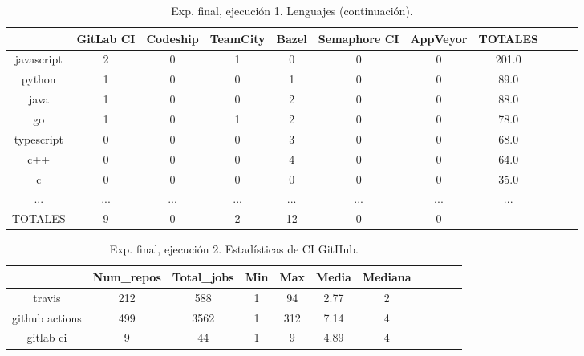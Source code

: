 \begin{table}[h]
  \centering
  \caption{Exp. final, ejecución 1. Lenguajes (continuación).}
  \label{tab:tabla_f2_2b}

\begin{footnotesize}
\renewcommand{\arraystretch}{1.5} %
\begin{tabular}{ccccccccccc}
  \hline
  {} &  GitLab CI &  Codeship &  TeamCity &  Bazel &  Semaphore CI &  AppVeyor &  TOTALES \\
  \hline
  javascript    &        2 &         0 &         1 &      0 &             0 &         0 &    201.0 \\
  python        &        1 &         0 &         0 &      1 &             0 &         0 &     89.0 \\
  java          &        1 &         0 &         0 &      2 &             0 &         0 &     88.0 \\
  go            &        1 &         0 &         1 &      2 &             0 &         0 &     78.0 \\
  typescript    &        0 &         0 &         0 &      3 &             0 &         0 &     68.0 \\
  c++           &        0 &         0 &         0 &      4 &             0 &         0 &     64.0 \\
  c             &        0 &         0 &         0 &      0 &             0 &         0 &     35.0 \\
  ...           &      ... &       ... &       ... &    ... &           ... &       ... &      ... \\
  TOTALES       &        9 &         0 &         2 &     12 &             0 &         0 &        - \\
 \end{tabular}
\end{footnotesize}

\end{table}

\begin{table}[h]
  \centering
  \caption{Exp. final, ejecución 2. Estadísticas de CI GitHub.}
  \label{tab:tabla_f2_3}

\begin{footnotesize}
\renewcommand{\arraystretch}{1.5} %
\begin{tabular}{ccccccccccc}
  \hline
  {} &  Num\_repos &  Total\_jobs &  Min &  Max &  Media &  Mediana \\
  \hline
  travis         &        212 &         588 &    1 &   94 &   2.77 &        2 \\
  github actions &        499 &        3562 &    1 &  312 &   7.14 &        4 \\
  gitlab ci      &          9 &          44 &    1 &    9 &   4.89 &        4 \\
 \end{tabular}
\end{footnotesize}

\end{table}

